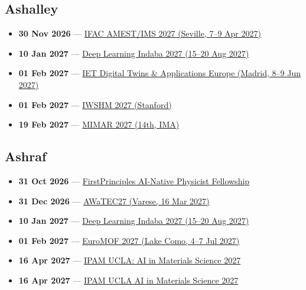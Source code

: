 \subsection*{Ashalley}
\begin{itemize}[leftmargin=1.4em,itemsep=0.1em]
  \item \textbf{30 Nov 2026} --- \href{https://www.linkedin.com/posts/digest-pn-6727052b0_callforpapers-ifac-amest2027-ims-2027-activity-7502622229021499393-pJOU}{IFAC AMEST/IMS 2027 (Seville, 7--9 Apr 2027)}
  \item \textbf{10 Jan 2027} --- \href{https://deeplearningindaba.com/}{Deep Learning Indaba 2027 (15--20 Aug 2027)}
  \item \textbf{01 Feb 2027} --- \href{https://digitaltwins.theiet.org/dta-europe-2027}{IET Digital Twins \& Applications Europe (Madrid, 8--9 Jun 2027)}
  \item \textbf{01 Feb 2027} --- \href{https://iwshm2027.stanford.edu/call_for_paper}{IWSHM 2027 (Stanford)}
  \item \textbf{19 Feb 2027} --- \href{https://ima.org.uk/29258/14th-ima-international-conference-on-modelling-in-industrial-maintenance-and-reliability-mimar2027/}{MIMAR 2027 (14th, IMA)}
\end{itemize}

\subsection*{Ashraf}
\begin{itemize}[leftmargin=1.4em,itemsep=0.1em]
  \item \textbf{31 Oct 2026} --- \href{https://www.firstprinciplesfoundation.org/programs}{FirstPrinciples AI-Native Physicist Fellowship}
  \item \textbf{31 Dec 2026} --- \href{https://awatec27.dista.uninsubria.it/}{AWaTEC27 (Varese, 16 Mar 2027)}
  \item \textbf{10 Jan 2027} --- \href{https://deeplearningindaba.com/}{Deep Learning Indaba 2027 (15--20 Aug 2027)}
  \item \textbf{01 Feb 2027} --- \href{https://euromof2027.com/}{EuroMOF 2027 (Lake Como, 4--7 Jul 2027)}
  \item \textbf{16 Apr 2027} --- \href{https://atomgrants.com/grant/artificial-intelligence-materials-science-institute-for-pure-and-applied-mathematics}{IPAM UCLA: AI in Materials Science 2027}
  \item \textbf{16 Apr 2027} --- \href{https://atomgrants.com/grant/artificial-intelligence-materials-science-institute-for-pure-and-applied-mathematics}{IPAM UCLA AI in Materials Science 2027}
\end{itemize}

